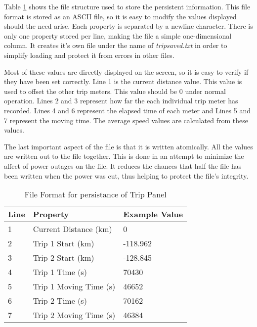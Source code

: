 Table \ref{tab:tripformat} shows the file structure used to store the persistent information. This file format is stored as an ASCII file, so it is easy to modify the values displayed should the need arise. Each property is separated by a newline character. There is only one property stored per line, making the file a simple one-dimensional column. It creates it's own file under the name of \emph{tripsaved.txt} in order to simplify loading and protect it from errors in other files.

Most of these values are directly displayed on the screen, so it is easy to verify if they have been set correctly. Line 1 is the current distance value. This value is used to offset the other trip meters. This value should be 0 under normal operation. Lines 2 and 3 represent how far the each individual trip meter has recorded. Lines 4 and 6 represent the elapsed time of each meter and Lines 5 and 7 represent the moving time. The average speed values are calculated from these values.

The last important aspect of the file is that it is written atomically. All the values are written out to the file together. This is done in an attempt to minimize the affect of power outages on the file. It reduces the chances that half the file has been written when the power was cut, thus helping to protect the file's integrity.

\begin{table}
\begin{center}
    \begin{tabular}{|l|l|l|}
        \hline
        Line & Property              & Example Value \\ \hline
        1    & Current Distance (km)  & 0       \\ 
        2    & Trip 1 Start (km)  & -118.962       \\ 
        3    & Trip 2 Start (km)     & -128.845          \\ 
        4    & Trip 1 Time (s)    & 70430            \\ 
        5    & Trip 1 Moving Time (s) & 46652         \\
        6    & Trip 2 Time (s)    & 70162            \\ 
        7    & Trip 2 Moving Time (s) & 46384         \\
        \hline
    \end{tabular}
	\caption{File Format for persistance of Trip Panel}
	\label{tab:tripformat}
\end{center}
\end{table}



